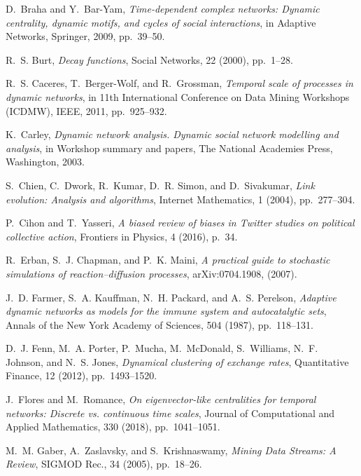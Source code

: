 \documentclass[journal,transmag]{IEEEtran}
\begin{document}
\begin{thebibliography}{10}
{\sc D.~Braha and Y.~Bar-Yam}, {\em Time-dependent complex networks: Dynamic
  centrality, dynamic motifs, and cycles of social interactions}, in Adaptive
  Networks, Springer, 2009, pp.~39--50.

{\sc R.~S. Burt}, {\em Decay functions}, Social Networks, 22 (2000), pp.~1--28.

{\sc R.~S. Caceres, T.~Berger-Wolf, and R.~Grossman}, {\em Temporal scale of
  processes in dynamic networks}, in 11th International Conference on Data
  Mining Workshops (ICDMW), IEEE, 2011, pp.~925--932.

{\sc K.~Carley}, {\em Dynamic network analysis. {D}ynamic social network
  modelling and analysis}, in Workshop summary and papers, The National
  Academies Press, Washington, 2003.

{\sc S.~Chien, C.~Dwork, R.~Kumar, D.~R. Simon, and D.~Sivakumar}, {\em Link
  evolution: {A}nalysis and algorithms}, Internet Mathematics, 1 (2004),
  pp.~277--304.

{\sc P.~Cihon and T.~Yasseri}, {\em A biased review of biases in {T}witter
  studies on political collective action}, Frontiers in Physics, 4 (2016),
  p.~34.

{\sc R.~Erban, S.~J. Chapman, and P.~K. Maini}, {\em A practical guide to
  stochastic simulations of reaction--diffusion processes}, arXiv:0704.1908,
  (2007).

{\sc J.~D. Farmer, S.~A. Kauffman, N.~H. Packard, and A.~S. Perelson}, {\em
  Adaptive dynamic networks as models for the immune system and autocatalytic
  sets}, Annals of the New York Academy of Sciences, 504 (1987), pp.~118--131.

{\sc D.~J. Fenn, M.~A. Porter, P.~Mucha, M.~McDonald, S.~Williams, N.~F.
  Johnson, and N.~S. Jones}, {\em Dynamical clustering of exchange rates},
  Quantitative Finance, 12 (2012), pp.~1493--1520.

{\sc J.~Flores and M.~Romance}, {\em On eigenvector-like centralities for
  temporal networks: Discrete vs. continuous time scales}, Journal of
  Computational and Applied Mathematics, 330 (2018), pp.~1041--1051.

{\sc M.~M. Gaber, A.~Zaslavsky, and S.~Krishnaswamy}, {\em {Mining Data
  Streams: {A} Review}}, SIGMOD Rec., 34 (2005), pp.~18--26.


\end{thebibliography}
\end{document}
